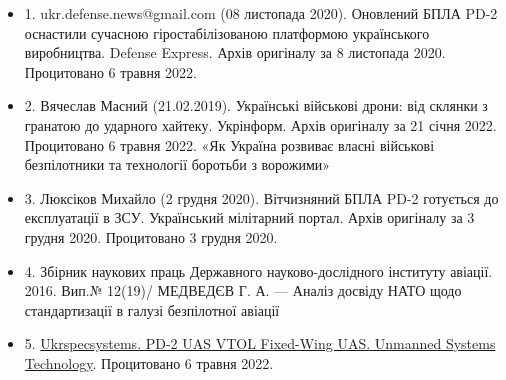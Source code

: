 \begin{itemize} %

\item 1. ukr.defense.news@gmail.com (08 листопада 2020). Оновлений БПЛА PD-2
оснастили сучасною гіростабілізованою платформою українського виробництва.
Defense Express. Архів оригіналу за 8 листопада 2020. Процитовано 6 травня
2022.

\item 2. Вячеслав Масний (21.02.2019). Українські військові дрони: від склянки з
гранатою до ударного хайтеку. Укрінформ. Архів оригіналу за 21 січня 2022.
Процитовано 6 травня 2022. «Як Україна розвиває власні військові безпілотники
та технології боротьби з ворожими»

\item 3. Люксіков Михайло (2 грудня 2020). Вітчизняний БПЛА PD-2 готується до
експлуатації в ЗСУ. Український мілітарний портал. Архів оригіналу за 3 грудня
2020. Процитовано 3 грудня 2020.

\item 4. Збірник наукових праць Державного науково-дослідного інституту авіації.
2016. Вип.№ 12(19)/ МЕДВЕДЄВ Г. А. — Аналіз досвіду НАТО щодо стандартизації в
галузі безпілотної авіації

\item 5. \href{https://www.unmannedsystemstechnology.com/company/ukrspecsystems/pd-2-uas-vtol-fixed-wing-uas/}{Ukrspecsystems. PD-2 UAS VTOL Fixed-Wing UAS. Unmanned Systems Technology}.
Процитовано 6 травня 2022.

\end{itemize} %
